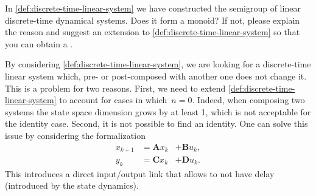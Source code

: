 \begin{exercise}
    In \cref{def:discrete-time-linear-system} we have constructed the semigroup of linear discrete-time dynamical systems.
    Does it form a monoid?
    If not, please explain the reason and suggest an extension to \cref{def:discrete-time-linear-system} so that you can obtain a .
\end{exercise}
\begin{solution}
    By considering \cref{def:discrete-time-linear-system}, we are looking for a discrete-time linear system which, pre- or post-composed with another one does not change it.
    This is a problem for two reasons.
    First, we need to extend \cref{def:discrete-time-linear-system} to account for cases in which~$n=0$.
    Indeed, when composing two systems the state space dimension grows by at least 1, which is not acceptable for the identity case.
    Second, it is not possible to find an identity.
    One can solve this issue by considering the formalization
    \begin{equation}
        \label{eq:discrete-time-dynamics-D}
        \begin{aligned}
            x_{k+1} & =  \mathbf{A} x_k & + \mathbf{B} u_k, \\
            y_{k}   & =  \mathbf{C} x_k & + \mathbf{D} u_k.
        \end{aligned}
    \end{equation}
    This introduces a direct input/output link that allows to not have delay (introduced by the state dynamics).
\end{solution}

